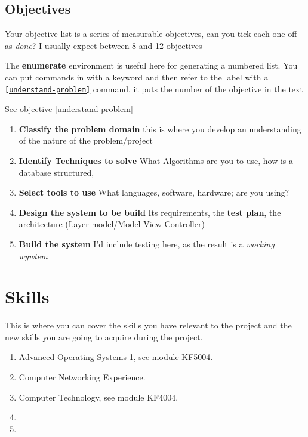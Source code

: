 \subsection{Objectives}
Your objective list is a series of measurable objectives, can you tick each one off as \emph{done}?  I usually expect between 8 and 12 objectives

The \textbf{enumerate} environment is useful here for generating a numbered list.   You can put \texttt{\label{}} commands in with a keyword \texttt{\label{understand-problem}} and then refer to the label with a \texttt{\ref{understand-problem}} command, it puts the number of the objective in the text
\begin{tcblisting}{ }
	See objective \ref{understand-problem}
\end{tcblisting}
\begin{enumerate}
	\item \textbf{Classify the problem domain}\label{understand-problem}  this is where you develop an understanding of the nature of the problem/project
	\item \textbf{Identify Techniques to solve}  What Algorithms are you to use, how is a database structured,
	\item \textbf{Select tools to use}  What languages, software, hardware; are you using?
	\item \textbf{Design the system to be build}\label{write-code}  Its requirements, the \textbf{test plan}, the architecture (Layer model/Model-View-Controller)
	\item \textbf{Build the system}  I'd include testing here, as the result is a \emph{working wywtem}
\end{enumerate}

\section{Skills}
This is where you can cover the skills you have relevant to the project and the new skills you are going to acquire during the project.
\begin{enumerate}
	\item Advanced Operating Systems 1, see module KF5004.
	\item Computer Networking Experience.
	\item Computer Technology, see module KF4004.
	\item 
	\item
\end{enumerate}

